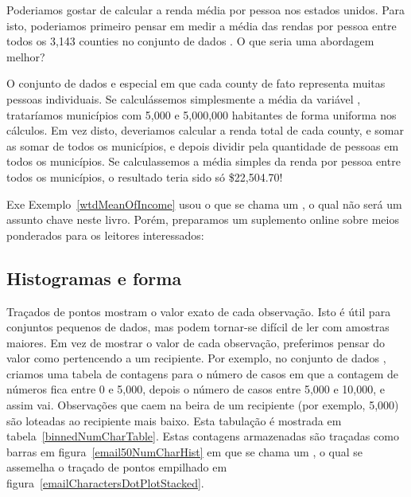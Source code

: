 \begin{example}{

  Poderiamos gostar de calcular a renda média por pessoa nos estados unidos.
  Para isto, poderiamos primeiro pensar em medir a média das rendas por pessoa entre todos os 3,143 counties no conjunto de dados .
  O que seria uma abordagem melhor?
} \label{wtdMeanOfIncome}
O conjunto de dados  e especial em que cada county de fato representa muitas pessoas individuais.
Se calculássemos simplesmente a média da variável , trataríamos municípios com 5,000 e 5,000,000 habitantes de forma uniforma nos cálculos.
Em vez disto, deveriamos calcular a renda total de cada county, e somar as somar de todos os municípios, e depois dividir pela quantidade de pessoas em todos os municípios.
Se calculassemos a média simples da renda por pessoa entre todos os municípios, o resultado teria sido só \$22,504.70!
\end{example}

Exe
Exemplo~\ref{wtdMeanOfIncome} usou o que se chama um , o qual não será um assunto chave neste livro.
Porém, preparamos um suplemento online sobre meios ponderados para os leitores interessados:
\begin{center}
\end{center}

\subsection{Histogramas e forma}
\label{histogramsAndShape}

Traçados de pontos mostram o valor exato de cada observação.
Isto é útil para conjuntos pequenos de dados, mas podem tornar-se difícil de ler com amostras maiores.
Em vez de mostrar o valor de cada observação, preferimos pensar do valor como pertencendo a um recipiente.
Por exemplo, no conjunto de dados , criamos uma tabela de contagens para o número de casos em que a contagem de números fica entre 0 e 5,000, depois o número de casos entre 5,000 e 10,000, e assim vai.
Observações que caem na beira de um recipiente (por exemplo, 5,000) são loteadas ao recipiente mais baixo.
Esta tabulação é mostrada em tabela~\ref{binnedNumCharTable}.
Estas contagens armazenadas são traçadas como barras em figura~\ref{email50NumCharHist} em que se chama um , o qual se assemelha o traçado de pontos empilhado em figura~\ref{emailCharactersDotPlotStacked}.

